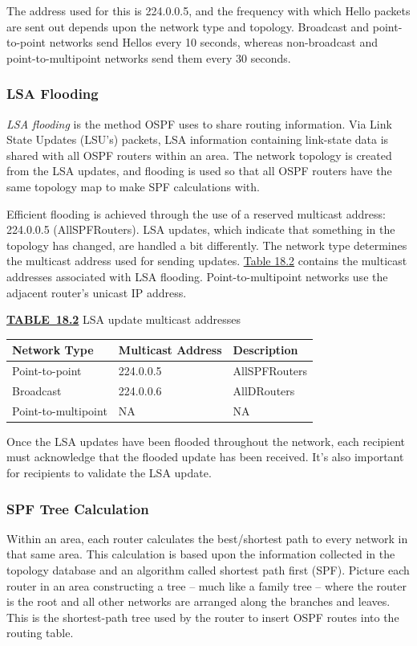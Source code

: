 The address used for this is 224.0.0.5, and the frequency with which Hello packets are sent
out depends upon the network type and topology. Broadcast and
point-to-point networks send Hellos every 10 seconds, whereas
non-broadcast and point-to-multipoint networks send them every 30 seconds.

\subsubsection{LSA Flooding}

\emph{LSA flooding} is the method OSPF uses to share routing
information. Via Link State Updates (LSU's) packets, LSA information
containing link-state data is shared with all OSPF routers within an
area. The network topology is created from the LSA updates, and flooding
is used so that all OSPF routers have the same topology map to make SPF
calculations with.

Efficient flooding is achieved through the use of a reserved multicast
address: 224.0.0.5 (AllSPFRouters). LSA updates, which indicate that
something in the topology has changed, are handled a bit differently.
The network type determines the multicast address used for sending
updates. \protect\hyperlink{c18.xhtmlux5cux23table18-2}{Table 18.2}
contains the multicast addresses associated with LSA flooding.
Point-to-multipoint networks use the adjacent router's unicast IP
address.

{\protect\hyperlink{c18.xhtmlux5cux23tableanchor18-2}{\textbf{TABLE~18.2}}
LSA update multicast addresses}

\begin{longtable}[]{@{}lll@{}}
\toprule
Network Type & Multicast Address & Description\tabularnewline
\midrule
\endhead
Point-to-point & 224.0.0.5 & AllSPFRouters\tabularnewline
Broadcast & 224.0.0.6 & AllDRouters\tabularnewline
Point-to-multipoint & NA & NA\tabularnewline
\bottomrule
\end{longtable}

Once the LSA updates have been flooded throughout the network, each
recipient must acknowledge that the flooded update has been received.
It's also important for recipients to validate the LSA update.

\subsubsection{SPF Tree Calculation}

Within an area, each router calculates the best/shortest path to every
network in that same area. This calculation is based upon the
information collected in the topology database and an algorithm called
shortest path first (SPF). Picture each router in an area constructing a
tree -- much like a family tree -- where the router is the root and all
other networks are arranged along the branches and leaves. This is the
shortest-path tree used by the router to insert OSPF routes into the
routing table.

